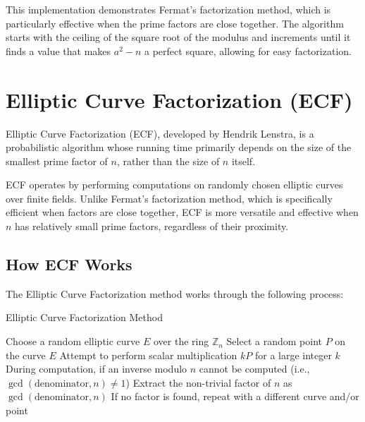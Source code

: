 \documentclass{article}
\begin{document}
\begin{notebox}[title=Implementation Note]
    This implementation demonstrates Fermat's factorization method, which is particularly effective when the prime factors are close together. The algorithm starts with the ceiling of the square root of the modulus and increments until it finds a value that makes $a^2 - n$ a perfect square, allowing for easy factorization.
\end{notebox}

\section{Elliptic Curve Factorization (ECF)}

\begin{definitionbox}[title=ECF Definition]
    Elliptic Curve Factorization (ECF), developed by Hendrik Lenstra, is a probabilistic algorithm whose running time primarily depends on the size of the smallest prime factor of $n$, rather than the size of $n$ itself.
\end{definitionbox}

ECF operates by performing computations on randomly chosen elliptic curves over finite fields. Unlike Fermat's factorization method, which is specifically efficient when factors are close together, ECF is more versatile and effective when $n$ has relatively small prime factors, regardless of their proximity.

\subsection*{How ECF Works}

The Elliptic Curve Factorization method works through the following process:

\begin{algorithm}
    \caption{Elliptic Curve Factorization Method}
    \begin{algorithmic}[1]
        \State Choose a random elliptic curve $E$ over the ring $\mathbb{Z}_n$
        \State Select a random point $P$ on the curve $E$
        \State Attempt to perform scalar multiplication $kP$ for a large integer $k$
        \State During computation, if an inverse modulo $n$ cannot be computed (i.e., $\gcd(\text{denominator}, n) \neq 1$)
        \State Extract the non-trivial factor of $n$ as $\gcd(\text{denominator}, n)$
        \State If no factor is found, repeat with a different curve and/or point
    \end{algorithmic}
\end{algorithm}
\end{document}
